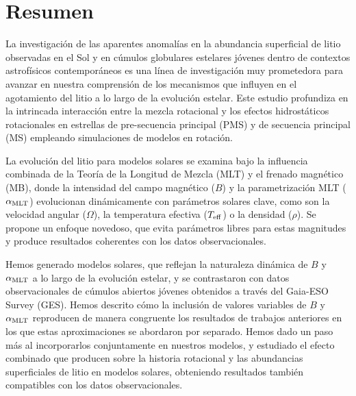 %


\chapter{Resumen}

La investigación de las aparentes anomalías en la abundancia superficial de litio observadas en el Sol y en cúmulos globulares estelares jóvenes dentro de contextos astrofísicos contemporáneos es una línea de investigación muy prometedora para avanzar en nuestra comprensión de los mecanismos que influyen en el agotamiento del litio a lo largo de la evolución estelar. Este estudio profundiza en la intrincada interacción entre la mezcla rotacional y los efectos hidrostáticos rotacionales en estrellas de pre-secuencia principal (PMS) y de secuencia principal (MS) empleando simulaciones de modelos en rotación.\par 

La evolución del litio para modelos solares se examina bajo la influencia combinada de la Teoría de la Longitud de Mezcla (MLT) y el frenado magnético (MB), donde la intensidad del campo magnético ($B$) y la parametrización MLT ($\alpha_{\mathrm{MLT}}$) evolucionan dinámicamente con parámetros solares clave, como son la velocidad angular ($\Omega$), la temperatura efectiva ($T_{\mathrm{eff}}$) o la densidad ($\rho$). Se propone un enfoque novedoso, que evita parámetros libres para estas magnitudes y produce resultados coherentes con los datos observacionales.\par

Hemos generado modelos solares, que reflejan la naturaleza dinámica de $B$ y $\alpha_{\mathrm{MLT}}$ a lo largo de la evolución estelar, y se contrastaron con datos observacionales de cúmulos abiertos jóvenes obtenidos a través del Gaia-ESO Survey (GES). Hemos descrito cómo la inclusión de valores variables de $B$ y $\alpha_{\mathrm{MLT}}$ reproducen de manera congruente los resultados de trabajos anteriores en los que estas aproximaciones se abordaron por separado. Hemos dado un paso más al incorporarlos conjuntamente en nuestros modelos, y estudiado el efecto combinado que producen sobre la historia rotacional y las abundancias superficiales de litio en modelos solares, obteniendo resultados también compatibles con los datos observacionales.\par

